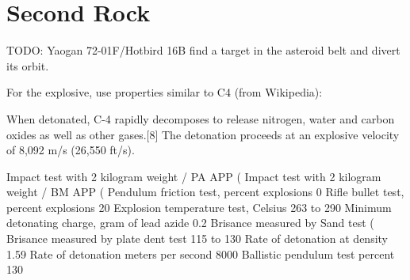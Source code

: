 %
%

\chapter{Second Rock}

TODO: Yaogan 72-01F/Hotbird 16B find a target in the asteroid belt and divert its orbit.

For the explosive, use properties similar to C4 (from Wikipedia):

When detonated, C-4 rapidly decomposes to release nitrogen, water and carbon oxides as well as other gases.[8] The detonation proceeds at an explosive velocity of 8,092 m/s (26,550 ft/s).

Impact test with 2 kilogram weight / PA APP (%
Impact test with 2 kilogram weight / BM APP (%
Pendulum friction test, percent explosions	0
Rifle bullet test, percent explosions	20
Explosion temperature test, Celsius	263 to 290
Minimum detonating charge, gram of lead azide	0.2
Brisance measured by Sand test (%
Brisance measured by plate dent test	115 to 130
Rate of detonation at density	1.59
Rate of detonation meters per second	8000
Ballistic pendulum test percent	130

\newpage
\thispagestyle{empty}
